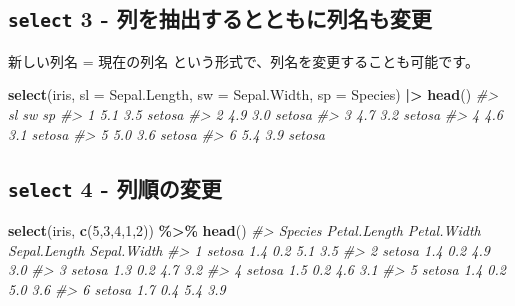 \documentclass[
  xelatex, ja=standard]{bxjsbook}
\newenvironment{Shaded}{\begin{snugshade}}{\end{snugshade}}
\newcommand{\AttributeTok}[1]{\textcolor[rgb]{0.13,0.29,0.53}{#1}}
\newcommand{\CommentTok}[1]{\textcolor[rgb]{0.56,0.35,0.01}{\textit{#1}}}
\newcommand{\DecValTok}[1]{\textcolor[rgb]{0.00,0.00,0.81}{#1}}
\newcommand{\FunctionTok}[1]{\textcolor[rgb]{0.13,0.29,0.53}{\textbf{#1}}}
\newcommand{\NormalTok}[1]{#1}
\newcommand{\SpecialCharTok}[1]{\textcolor[rgb]{0.81,0.36,0.00}{\textbf{#1}}}
\theoremstyle{definition}
\theoremstyle{definition}
\theoremstyle{definition}
\theoremstyle{definition}
\theoremstyle{remark}
\begin{document}
\hypertarget{select-3---ux5217ux3092ux62bdux51faux3059ux308bux3068ux3068ux3082ux306bux5217ux540dux3082ux5909ux66f4}{%
\subsection{\texorpdfstring{\texttt{select} 3 - 列を抽出するとともに列名も変更}{select 3 - 列を抽出するとともに列名も変更}}\label{select-3---ux5217ux3092ux62bdux51faux3059ux308bux3068ux3068ux3082ux306bux5217ux540dux3082ux5909ux66f4}}

新しい列名 = 現在の列名 という形式で、列名を変更することも可能です。

\begin{Shaded}
\begin{Highlighting}[]
\FunctionTok{select}\NormalTok{(iris, }\AttributeTok{sl =}\NormalTok{ Sepal.Length, }\AttributeTok{sw =}\NormalTok{ Sepal.Width, }\AttributeTok{sp =}\NormalTok{ Species) }\SpecialCharTok{|\textgreater{}} 
  \FunctionTok{head}\NormalTok{()}
\CommentTok{\#\textgreater{}    sl  sw     sp}
\CommentTok{\#\textgreater{} 1 5.1 3.5 setosa}
\CommentTok{\#\textgreater{} 2 4.9 3.0 setosa}
\CommentTok{\#\textgreater{} 3 4.7 3.2 setosa}
\CommentTok{\#\textgreater{} 4 4.6 3.1 setosa}
\CommentTok{\#\textgreater{} 5 5.0 3.6 setosa}
\CommentTok{\#\textgreater{} 6 5.4 3.9 setosa}
\end{Highlighting}
\end{Shaded}

\hypertarget{select-4---ux5217ux9806ux306eux5909ux66f4}{%
\subsection{\texorpdfstring{\texttt{select} 4 - 列順の変更}{select 4 - 列順の変更}}\label{select-4---ux5217ux9806ux306eux5909ux66f4}}

\begin{Shaded}
\begin{Highlighting}[]
\FunctionTok{select}\NormalTok{(iris, }\FunctionTok{c}\NormalTok{(}\DecValTok{5}\NormalTok{,}\DecValTok{3}\NormalTok{,}\DecValTok{4}\NormalTok{,}\DecValTok{1}\NormalTok{,}\DecValTok{2}\NormalTok{)) }\SpecialCharTok{\%\textgreater{}\%} \FunctionTok{head}\NormalTok{()}
\CommentTok{\#\textgreater{}   Species Petal.Length Petal.Width Sepal.Length Sepal.Width}
\CommentTok{\#\textgreater{} 1  setosa          1.4         0.2          5.1         3.5}
\CommentTok{\#\textgreater{} 2  setosa          1.4         0.2          4.9         3.0}
\CommentTok{\#\textgreater{} 3  setosa          1.3         0.2          4.7         3.2}
\CommentTok{\#\textgreater{} 4  setosa          1.5         0.2          4.6         3.1}
\CommentTok{\#\textgreater{} 5  setosa          1.4         0.2          5.0         3.6}
\CommentTok{\#\textgreater{} 6  setosa          1.7         0.4          5.4         3.9}
\end{Highlighting}
\end{Shaded}
\end{document}
